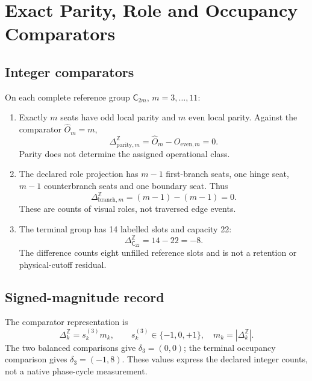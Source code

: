 \section{Exact Parity, Role and Occupancy Comparators}\label{manual2:app:coordinate-phase-delta3}

\subsection{Integer comparators}\label{manual2:app:delta3-form}
On each complete reference group \(\mathsf C_{2m}\), \(m=3,\ldots,11\):
\begin{enumerate}
\item Exactly \(m\) seats have odd local parity and \(m\) even local parity. Against the comparator \(\widehat O_m=m\),
\[
\Delta^{\mathbb Z}_{\mathrm{parity},m}=\widehat O_m-O_{\mathrm{even},m}=0.
\]
Parity does not determine the assigned operational class.
\item The declared role projection has \(m-1\) first-branch seats, one hinge seat, \(m-1\) counterbranch seats and one boundary seat. Thus
\[
\Delta^{\mathbb Z}_{\mathrm{branch},m}=(m-1)-(m-1)=0.
\]
These are counts of visual roles, not traversed edge events.
\item The terminal group has 14 labelled slots and capacity 22:
\[
\Delta^{\mathbb Z}_{\mathsf C_{22}}=14-22=-8.
\]
The difference counts eight unfilled reference slots and is not a retention or physical-cutoff residual.
\end{enumerate}

\subsection{Signed-magnitude record}\label{manual2:app:delta3-lock}
The comparator representation is
\[
\Delta^{\mathbb Z}_k=s_k^{(3)}m_k,\qquad
s_k^{(3)}\in\{-1,0,+1\},\quad m_k=|\Delta^{\mathbb Z}_k|.
\]
The two balanced comparisons give \(\delta_3=(0,0)\); the terminal occupancy comparison gives \(\delta_3=(-1,8)\). These values express the declared integer counts, not a native phase-cycle measurement.

